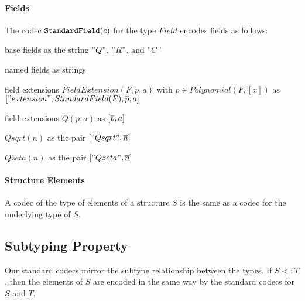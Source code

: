 \paragraph{Fields}
The codec $\cn{StandardField}(c)$ for the type $Field$ encodes fields as follows:
\begin{compactitem}
 \item base fields as the string $"Q"$, $"R"$, and $"C"$
 \item named fields as strings
 \item field extensions $FieldExtension(F,p,a)$ with $p\in Polynomial(F,[x])$ as $["extension", StandardField(F), \ov{p}, a]$ 
 \item field extensions $Q(p,a)$ as $[\ov{p},a]$ 
 \item $Qsqrt(n)$ as the pair $["Qsqrt", \ov{n}]$
 \item $Qzeta(n)$ as the pair $["Qzeta", \ov{n}]$
\end{compactitem}

\paragraph{Structure Elements}
A codec of the type of elements of a structure $S$ is the same as a codec for the underlying type of $S$.

\subsection{Subtyping Property}

Our standard codecs mirror the subtype relationship between the types.
If $S<: T$, then the elements of $S$ are encoded in the same way by the standard codecs for $S$ and $T$.

